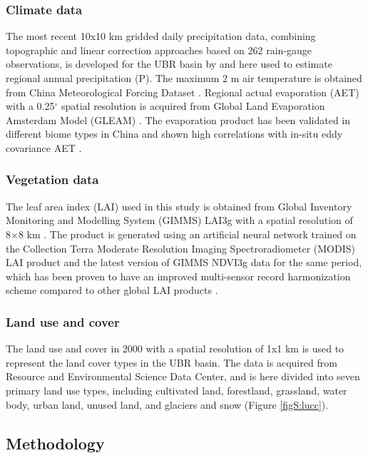\documentclass[hess, manuscript]{copernicus}
\begin{document}
\subsubsection{Climate data}
The most recent 10x10 km gridded daily precipitation data, combining topographic and linear correction approaches based on 262 rain-gauge observations, is developed for the UBR basin by \citet{sun2020precipitation} and here used to estimate regional annual precipitation (P). 
The maximum 2 m air temperature is obtained from China Meteorological Forcing Dataset \citep{he2020first}.
Regional actual evaporation (AET) with a 0.25$^{\circ}$ spatial resolution is acquired from Global Land Evaporation Amsterdam Model (GLEAM) \citep{martens2017gleam}. The evaporation product has been validated in different biome types in China and shown high correlations with in-situ eddy covariance AET \citep{yang2017multi}.

\subsubsection{Vegetation data}
The leaf area index (LAI) used in this study is obtained from Global Inventory Monitoring and Modelling System (GIMMS) LAI3g with a spatial resolution of 8×8 km \citep{zhu2013global}. 
The product is generated using an artificial neural network trained on the Collection Terra Moderate Resolution Imaging Spectroradiometer (MODIS) LAI product and the latest version of GIMMS NDVI3g data for the same period, 
which has been proven to have an improved multi-sensor record harmonization scheme compared to other global LAI products \citep{forzieri2020increased,gonsamo2021greening}. 

\subsubsection{Land use and cover}
The land use and cover in 2000 with a spatial resolution of 1x1 km is used to represent the land cover types in the UBR basin. The data is acquired from Resource and Environmental Science Data Center, and is here divided into seven primary land use types, including cultivated land, forestland, grassland, water body, urban land, unused land, and glaciers and snow (Figure \ref{figS:lucc}). %

\subsection{Methodology}
\end{document}
